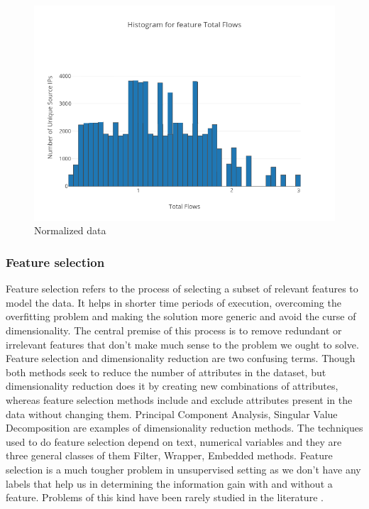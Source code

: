 \begin{figure}[t]
	\centerline{\includegraphics[scale = 0.9]{transformed.png}}
	\caption{Normalized data}%
\end{figure}



\subsubsection{Feature selection}		
	
	Feature selection refers to the process of selecting a subset of relevant features to model the data. It helps in shorter time periods of execution, overcoming the overfitting problem and making the solution more generic and avoid the curse of dimensionality. The central premise of this process is to remove redundant or irrelevant features that don't make much sense to the problem we ought to solve. Feature selection and dimensionality reduction are two confusing terms. Though both methods seek to reduce the number of attributes in the dataset, but dimensionality reduction does it by creating new combinations of attributes, whereas feature selection methods include and exclude attributes present in the data without changing them. Principal Component Analysis, Singular Value Decomposition are examples of dimensionality reduction methods. The techniques used to do feature selection depend on text, numerical variables and they are three general classes of them Filter, Wrapper, Embedded methods.	Feature selection is a much tougher problem in unsupervised setting as we don't have any labels that help us in determining the information gain with and without a feature. Problems of
	this kind have been rarely studied in the literature \cite{boutsidis2009unsupervised} \cite{dash2002feature}. 
	
